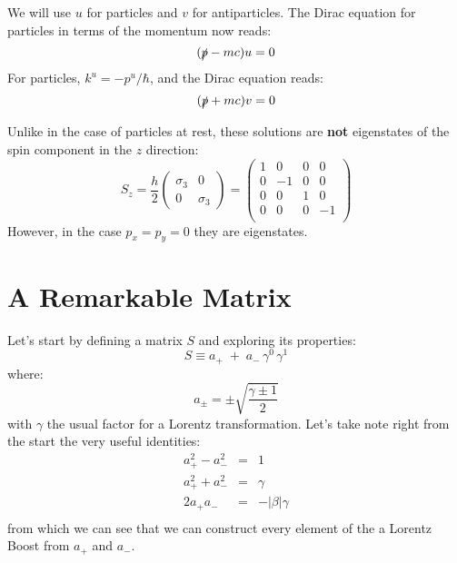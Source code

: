 \documentclass[12pt]{book}
\begin{document}
We will use $u$ for particles and $v$ for antiparticles.  The Dirac equation for particles in terms of the momentum now reads:
$$(\slashed{p}-mc) u = 0$$
For particles, $k^u = -p^u / \hbar$, and the Dirac equation reads:
$$(\slashed{p}+mc) v = 0$$

Unlike in the case of particles at rest, these solutions are {\bf not} eigenstates of the spin component in the $z$ direction:
$$S_z = \frac{h}{2} \begin{pmatrix} \sigma_3 & 0 \\ 0 & \sigma_3 \end{pmatrix}
= \begin{pmatrix} 
1 & 0 & 0 & 0 \\ 
0 &-1 & 0 & 0 \\ 
0 & 0 & 1 & 0 \\ 
0 & 0 & 0 &-1 \\ 
\end{pmatrix}
$$
However, in the case $p_x=p_y=0$ they are eigenstates.

\section{A Remarkable Matrix}
Let's start by defining a matrix $S$ and exploring its properties:
$$S \equiv a_+ \; + \; a_- \, \gamma^0 \, \gamma^1$$
where:
$$a_\pm = \pm \sqrt{\frac{\gamma \pm 1}{2}}$$
with $\gamma$ the usual factor for a Lorentz transformation.  Let's take note right from the start the very useful identities:
\begin{eqnarray*}
a_{+}^2 - a_{-}^2 &=& 1 \\
a_{+}^2 + a_{-}^2 &=& \gamma \\
2 a_{+} a_{-} &=& -|\beta| \gamma \\
\end{eqnarray*}
from which we can see that we can construct every element of the a Lorentz Boost from $a_+$ and $a_-$.
\end{document}
